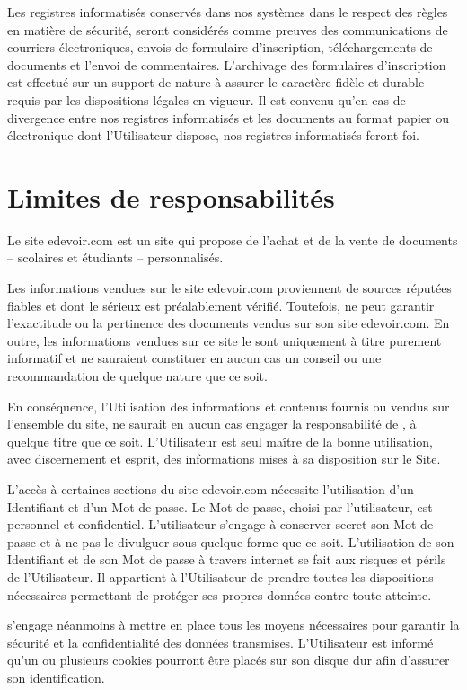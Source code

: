 Les registres informatisés conservés dans nos systèmes dans le respect des règles en matière de sécurité, seront considérés comme preuves des communications de courriers électroniques, envois de formulaire d'inscription, téléchargements de documents et l'envoi de commentaires. L'archivage des formulaires d'inscription est effectué sur un support de nature à assurer le caractère fidèle et durable requis par les dispositions légales en vigueur. Il est convenu qu'en cas de divergence entre nos registres informatisés et les documents au format papier ou électronique dont l'Utilisateur dispose, nos registres informatisés feront foi.

 
\section{Limites de responsabilités}

Le site edevoir.com est un site qui propose de l'achat et de la vente de documents -- scolaires et étudiants -- personnalisés.

Les informations vendues sur le site edevoir.com proviennent de sources réputées fiables et dont le sérieux est préalablement vérifié. Toutefois, \eDevoir ne peut garantir l'exactitude ou la pertinence des documents vendus sur son site edevoir.com. En outre, les informations vendues sur ce site le sont uniquement à titre purement informatif et ne sauraient constituer en aucun cas un conseil ou une recommandation de quelque nature que ce soit.

En conséquence, l'Utilisation des informations et contenus fournis ou vendus sur l'ensemble du site, ne saurait en aucun cas engager la responsabilité de \eDevoir, à quelque titre que ce soit. L'Utilisateur est seul maître de la bonne utilisation, avec discernement et esprit, des informations mises à sa disposition sur le Site.

L'accès à certaines sections du site edevoir.com nécessite l'utilisation d'un Identifiant et d'un Mot de passe. Le Mot de passe, choisi par l'utilisateur, est personnel et confidentiel. L'utilisateur s'engage à conserver secret son Mot de passe et à ne pas le divulguer sous quelque forme que ce soit. L'utilisation de son Identifiant et de son Mot de passe à travers internet se fait aux risques et périls de l'Utilisateur. Il appartient à l'Utilisateur de prendre toutes les dispositions nécessaires permettant de protéger ses propres données contre toute atteinte.

\eDevoir s'engage néanmoins à mettre en place tous les moyens nécessaires pour garantir la sécurité et la confidentialité des données transmises. L'Utilisateur est informé qu'un ou plusieurs cookies pourront être placés sur son disque dur afin d'assurer son identification.


